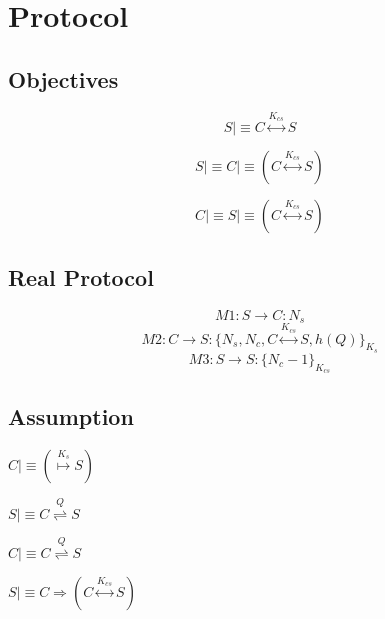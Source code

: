 \chapter{Protocol}

\section{Objectives}
\begin{equation}
	S \mid\equiv C \stackrel{ K_{cs} }\longleftrightarrow S
\end{equation}

\begin{equation}
	S \mid\equiv C \mid\equiv (C \stackrel{ K_{cs} }\longleftrightarrow S)
\end{equation}

\begin{equation}
	C \mid\equiv S \mid\equiv (C \stackrel{ K_{cs} }\longleftrightarrow S)
\end{equation}

\section{Real Protocol}
\begin{equation}
M1:  S \rightarrow C:  N_{s}
\end{equation}
\begin{equation}
M2:  C \rightarrow S: \{ N_{s}, N_{c}, C \stackrel{ K_{cs} }\longleftrightarrow S, h( Q ) \}_{K_{s}}
\end{equation}
\begin{equation}
M3:  S \rightarrow S: \{ N_{c} - 1 \}_{K_{cs}}
\end{equation}

\section{Assumption}

\noindent
$
C \mid\equiv (\stackrel{ K_{s} }\mapsto S)
$

\noindent
$
S \mid\equiv C \stackrel{ Q }\rightleftharpoons S
$

\noindent
$
C \mid\equiv C \stackrel{ Q }\rightleftharpoons S
$

\noindent
$
S \mid\equiv C \Rightarrow ( C \stackrel{ K_{cs} }\longleftrightarrow S )
$


